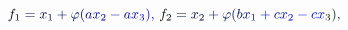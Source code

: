 \documentclass[12pt]{article}
\begin{document}
\makeatletter
\renewcommand*{\@textcolor}[3]{%
  \protect\leavevmode
  \begingroup
    \color#1{#2}#3%
  \endgroup
}
\makeatother
\begin{displaymath}
\mathcolor[RGB]{0,0,15}{f} _ { \mathcolor[RGB]{0,0,30}{1} } \mathcolor[RGB]{0,0,45}{=} \mathcolor[RGB]{0,0,60}{x} _ { \mathcolor[RGB]{0,0,75}{1} } \mathcolor[RGB]{0,0,90}{+} \mathcolor[RGB]{0,0,105}{\varphi} \mathcolor[RGB]{0,0,120}{(} \mathcolor[RGB]{0,0,135}{a} \mathcolor[RGB]{0,0,150}{x} _ { \mathcolor[RGB]{0,0,165}{2} } \mathcolor[RGB]{0,0,180}{-} \mathcolor[RGB]{0,0,195}{a} \mathcolor[RGB]{0,0,210}{x} _ { \mathcolor[RGB]{0,0,225}{3} } \mathcolor[RGB]{0,0,240}{)} \mathcolor[RGB]{0,0,255}{,} \mathcolor[RGB]{0,15,0}{\,
f} _ { \mathcolor[RGB]{0,15,15}{2} } \mathcolor[RGB]{0,15,30}{=} \mathcolor[RGB]{0,15,45}{x} _ { \mathcolor[RGB]{0,15,60}{2} } \mathcolor[RGB]{0,15,75}{+} \mathcolor[RGB]{0,15,90}{\varphi} \mathcolor[RGB]{0,15,105}{(} \mathcolor[RGB]{0,15,120}{b} \mathcolor[RGB]{0,15,135}{x} _ { \mathcolor[RGB]{0,15,150}{1} } \mathcolor[RGB]{0,15,165}{+} \mathcolor[RGB]{0,15,180}{c} \mathcolor[RGB]{0,15,195}{x} _ { \mathcolor[RGB]{0,15,210}{2} } \mathcolor[RGB]{0,15,225}{-} \mathcolor[RGB]{0,15,240}{c} \mathcolor[RGB]{0,15,255}{x} _ { \mathcolor[RGB]{0,30,0}{3} } \mathcolor[RGB]{0,30,15}{)} \mathcolor[RGB]{0,30,30}{,} \,
\end{displaymath}
\end{document}
